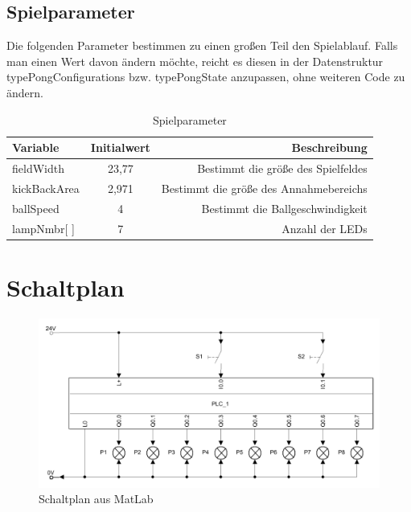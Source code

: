 \documentclass[a4paper]{article}
\begin{document}
     \subsection{Spielparameter}
      Die folgenden Parameter bestimmen zu einen großen Teil den Spielablauf. Falls man einen Wert davon ändern möchte, reicht es diesen in der Datenstruktur typePongConfigurations bzw. typePongState anzupassen, ohne weiteren Code zu ändern.
     \begin{table}[h!]
       \begin{center}
         \begin{tabular}{|l|c|r|}
        \hline 
           \textbf{Variable} & \textbf{Initialwert} & \textbf{Beschreibung}\\
           \hline
           fieldWidth & 23,77 & Bestimmt die größe des Spielfeldes\\
           \hline
           kickBackArea & 2,971 & Bestimmt die größe des Annahmebereichs\\
           \hline
           ballSpeed & 4 & Bestimmt die Ballgeschwindigkeit\\
           \hline
           lampNmbr[  ] & 7 & Anzahl der LEDs\\
           \hline
         \end{tabular}
         \caption{Spielparameter}
         \label{tab:Spielparameter}
       \end{center}
     \end{table}

    \section{Schaltplan}    %
    
     \begin{figure}[H]
         \includegraphics[width=\linewidth]{Image/Schaltplan.PNG}
         \caption{Schaltplan aus MatLab}
     \end{figure}
\end{document}
